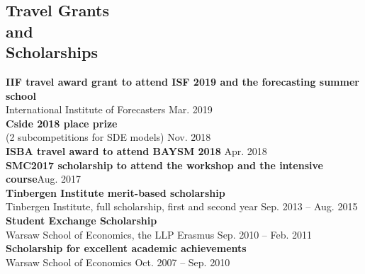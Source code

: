 \documentclass[margin,line]{resume}
\begin{document}
\begin{resume}
   \section{\mysidestyle Travel Grants\\ and \\ Scholarships}	
   	\textbf{IIF travel award grant to attend ISF 2019 and the forecasting summer school} \\
   	International Institute of Forecasters%
   	\hfill Mar. 2019 \vspace{1.5mm} \\ 
   	\textbf{Cside 2018  place  prize} \\
   	(2 subcompetitions for SDE models)%
   	 \hfill Nov. 2018 \vspace{1.5mm} \\ 
   	\textbf{ISBA travel award to attend BAYSM 2018} \hfill Apr. 2018 \vspace{1.5mm} \\ %
   	\textbf{SMC2017 scholarship to attend the workshop and the intensive course}\hfill Aug. 2017 \vspace{1.5mm} \\   %
   	\textbf{Tinbergen Institute merit-based scholarship}\\ Tinbergen Institute, full scholarship, first and second year%
   	\hfill Sep. 2013 -- Aug. 2015\vspace{1.5mm} \\   
       \textbf{Student Exchange Scholarship}\\  Warsaw School of Economics, the LLP Erasmus \hfill Sep. 2010 -- Feb. 2011\vspace{1.5mm} \\
       \textbf{Scholarship for excellent academic achievements}\\ Warsaw School of Economics \hfill Oct. 2007 -- Sep. 2010 
       
       


\end{resume}
\end{document}
